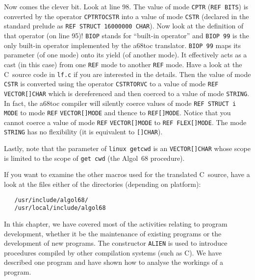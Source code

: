 Now comes the clever bit. Look at line 98. The value of mode
\verb|CPTR| (\verb|REF BITS|) is converted by the operator
\verb|CPTRTOCSTR| into a value of mode \verb|CSTR| (declared in the
standard prelude as \verb|REF STRUCT 16000000 CHAR|). Now look at the
definition of that operator (on line 95)! \verb|BIOP| stands for
``built-in operator'' and \verb|BIOP 99| is the only built-in
operator implemented by the a68toc translator. \verb|BIOP 99| maps
its parameter (of one mode) onto its yield (of another mode). It
effectively acts as a cast (in this case) from one \verb|REF| mode to
another \verb|REF| mode. Have a look at the C~source code in
\verb|lf.c| if you are interested in the details. Then the value of
mode \verb|CSTR| is converted using the operator \verb|CSTRTORVC| to
a value of mode \verb|REF VECTOR[]CHAR| which is dereferenced and
then coerced to a value of mode \verb|STRING|. In fact, the a68toc
compiler will silently coerce values of mode \verb|REF STRUCT i MODE|
to mode \verb|REF| \verb|VECTOR[]MODE| and thence to
\verb|REF[]MODE|.  Notice that you cannot coerce a value of mode
\verb|REF| \verb|VECTOR[]MODE| to \verb|REF FLEX[]MODE|. The mode
\verb|STRING| has no flexibility (it is equivalent to \verb|[]CHAR|).

Lastly, note that the parameter of \verb|linux getcwd| is an
 \verb|VECTOR[]CHAR| whose scope
is limited to the scope of \verb|get cwd| (the Algol~68 procedure).

If you want to examine the other macros used for the translated
C~source, have a look at the files either of the directories (depending on platform):
\begin{verbatim}
   /usr/include/algol68/
   /usr/local/include/algol68
\end{verbatim}

In this chapter, we have covered most of the activities relating to
program development, whether it be the maintenance of existing
programs or the development of new programs. The constructor
\verb|ALIEN| is used to introduce procedures compiled by other
compilation systems (such as C). We have described one program
and have shown how to analyse the workings of a program.
